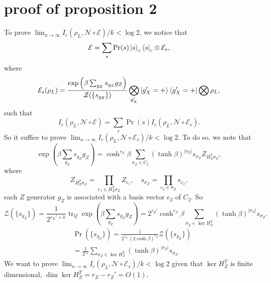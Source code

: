 \documentclass[twoside,english,aps,showpacs,pra,superscriptaddress]{revtex4-2}
\DeclareMathOperator{\tr}{tr}
\begin{document}
\section{proof of proposition 2}
To prove $\lim_{n\rightarrow\infty} I_c(\rho_L, \mathcal{N} \circ \mathcal{E})/k < \log 2 $, we notice that 
\begin{equation}
    \mathcal{E} = \sum_{s} \Pr(s) \ket{s}_c\bra{s}_c \otimes \mathcal{E}_s,
\end{equation}
where 
\begin{equation}
     \mathcal{E}_s(\rho_L) = \frac{\exp\left(\beta \sum_{g_Z} s_{g_Z} g_Z\right) }{\mathcal{Z}(\{s_{g_Z}\})} \bigotimes_{g_X'} \ket{g_X'=+} \bra{g_X'=+} \bigotimes \rho_L,
\end{equation}
such that
\begin{equation}
    I_c(\rho_L, \mathcal{N} \circ \mathcal{E}) = \sum_{s} \Pr(s) I_c(\rho_L, \mathcal{N} \circ \mathcal{E}_s).
\end{equation}
So it suffice to prove $\lim_{n\rightarrow\infty} I_c(\rho_L, \mathcal{N} \circ \mathcal{E}_s)/k < \log 2 $.
To do so, we note that 
\begin{equation}
     \exp\left(\beta \sum_{g_Z} s_{g_Z} g_Z\right) = \cosh^{r_Z}\beta \sum_{\sigma_Z \in C_2} (\tanh \beta)^{|\sigma_Z|} s_{\sigma_Z} Z_{H_Z^T \sigma_Z},
\end{equation}
where \begin{equation}
    Z_{H_Z^T \sigma_Z} = \prod_{e_1 \in H_Z^T \sigma_Z} Z_{e_1}, \quad s_{\sigma_Z} = \prod _{e_2 \in \sigma_Z} s_{e_2},
\end{equation}
each $Z$ generator $g_Z$ is associated with a basis vector $e_2$ of $C_2$. So
\begin{equation}
    \mathcal{Z}(\{s_{g_Z}\}) = \frac{1}{2^{r_X'+k}}\tr_Q \exp\left(\beta \sum_{g_Z} s_{g_Z} g_Z\right) = 2^{r_Z'} \cosh^{r_Z}\beta \sum_{\sigma_Z \in \ker H_Z^T} (\tanh \beta)^{|\sigma_Z|} s_{\sigma_Z}.
\end{equation}
\begin{equation}
\begin{aligned}
    & \Pr(\{s_{g_Z}\}) = \frac{1}{2^{r_Z'} (2\cosh\beta)^{r_Z}} \mathcal{Z}(\{s_{g_Z}\})\\
    &= \frac{1}{2^{r_Z}}  \sum_{\sigma_Z \in \ker H_Z^T} (\tanh \beta)^{|\sigma_Z|} s_{\sigma_Z}
\end{aligned}
\end{equation}
We want to prove $\lim_{n\rightarrow\infty} I_c(\rho_L, \mathcal{N} \circ \mathcal{E}_s)/k < \log 2 $ given that $\ker H_Z^T$ is finite dimensional, $\dim \ker H_Z^T = r_Z - r_Z'= O(1)$.
\end{document}
